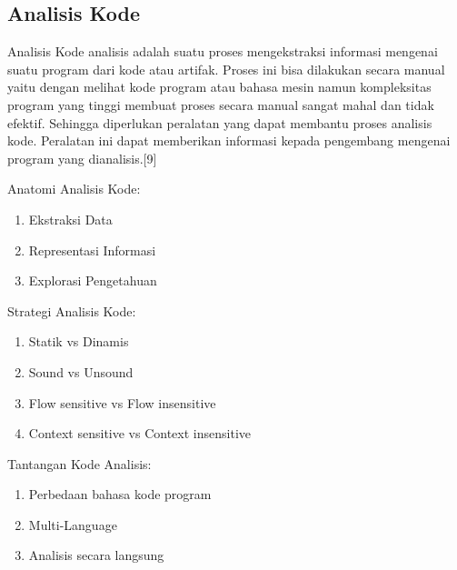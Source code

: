 \subsection{Analisis Kode}
Analisis Kode analisis adalah suatu proses mengekstraksi informasi mengenai suatu program dari kode atau artifak. Proses ini bisa dilakukan secara manual yaitu dengan melihat kode program atau bahasa mesin namun kompleksitas program yang tinggi membuat proses secara manual sangat mahal dan tidak efektif. Sehingga diperlukan peralatan yang dapat membantu proses analisis kode. Peralatan ini dapat memberikan informasi kepada pengembang mengenai program yang dianalisis.[9] 

Anatomi Analisis Kode:
\begin{enumerate}[leftmargin=1.3cm]
	\item Ekstraksi Data
	
	\item Representasi Informasi
	
	\item Explorasi Pengetahuan
\end{enumerate}

Strategi Analisis Kode:
\begin{enumerate}[leftmargin=1.3cm]
	\item Statik vs Dinamis\\
	
	\item Sound vs Unsound\\
	
	\item Flow sensitive vs Flow insensitive\\
	
	\item Context sensitive vs Context insensitive\\
	
\end{enumerate}

Tantangan Kode Analisis:
\begin{enumerate}[leftmargin=1.3cm]
	\item Perbedaan bahasa kode program\\
	
	\item Multi-Language\\
	
	\item Analisis secara langsung\\
	
\end{enumerate}

